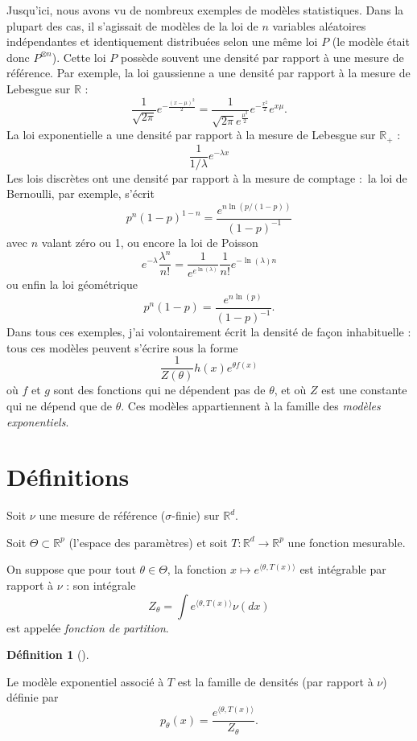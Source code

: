 \documentclass[
  10,
  letterpaper,
  DIV=11,
  numbers=noendperiod]{scrreport}
\theoremstyle{plain}
\theoremstyle{definition}
\theoremstyle{plain}
\theoremstyle{definition}
\newtheorem{definition}{Définition}[chapter]
\theoremstyle{definition}
\theoremstyle{plain}
\theoremstyle{remark}
\begin{document}
Jusqu'ici, nous avons vu de nombreux exemples de modèles statistiques.
Dans la plupart des cas, il s'agissait de modèles de la loi de \(n\)
variables aléatoires indépendantes et identiquement distribuées selon
une même loi \(P\) (le modèle était donc \(P^{\otimes n}\)). Cette loi
\(P\) possède souvent une densité par rapport à une mesure de référence.
Par exemple, la loi gaussienne a une densité par rapport à la mesure de
Lebesgue sur \(\mathbb{R}\) :
\[ \frac{1}{\sqrt{2\pi}}e^{-\frac{(x-\mu)^2}{2}}=\frac{1}{\sqrt{2\pi}e^{\frac{\mu^2}{2}}}e^{-\frac{x^2}{2}}e^{x\mu}.\]
La loi exponentielle a une densité par rapport à la mesure de Lebesgue
sur \(\mathbb{R}_+\) : \[ \frac{1}{1/\lambda}e^{-\lambda x}\] Les lois
discrètes ont une densité par rapport à la mesure de comptage :~la loi
de Bernoulli, par exemple, s'écrit
\[ p^n(1-p)^{1-n} = \frac{e^{n\ln(p/(1-p))}}{(1-p)^{-1}} \] avec \(n\)
valant zéro ou 1, ou encore la loi de Poisson
\[ e^{-\lambda}\frac{\lambda^n}{n!} = \frac{1}{e^{e^{\ln(\lambda)}}}\frac{1}{n!}e^{-\ln(\lambda)n}\]
ou enfin la loi géométrique
\[p^n(1-p) = \frac{e^{n\ln(p)}}{(1-p)^{-1}}.\] Dans tous ces exemples,
j'ai volontairement écrit la densité de façon inhabituelle : tous ces
modèles peuvent s'écrire sous la forme
\[ \frac{1}{Z(\theta)}h(x)e^{\theta f(x)}\] où \(f\) et \(g\) sont des
fonctions qui ne dépendent pas de \(\theta\), et où \(Z\) est une
constante qui ne dépend que de \(\theta\). Ces modèles appartiennent à
la famille des \emph{modèles exponentiels}.

\hypertarget{duxe9finitions}{%
\section{Définitions}\label{duxe9finitions}}

Soit \(\nu\) une mesure de référence (\(\sigma\)-finie) sur
\(\mathbb{R}^d\).

Soit \(\Theta \subset \mathbb{R}^p\) (l'espace des paramètres) et soit
\(T : \mathbb{R}^d \to \mathbb{R}^p\) une fonction mesurable.

On suppose que pour tout \(\theta \in \Theta\), la fonction
\(x \mapsto e^{\langle \theta, T(x)\rangle}\) est intégrable par rapport
à \(\nu\) : son intégrale
\[Z_\theta = \int e^{\langle \theta, T(x)\rangle}\nu(dx)\] est appelée
\emph{fonction de partition}.

\begin{definition}[]\protect\hypertarget{def-modele_expo}{}\label{def-modele_expo}

Le modèle exponentiel associé à \(T\) est la famille de densités (par
rapport à \(\nu\)) définie par
\[ p_\theta(x) = \frac{e^{\langle \theta, T(x)\rangle}}{Z_\theta}.\]

\end{definition}
\end{document}
